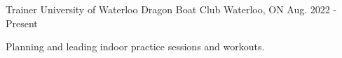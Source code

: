 

\begin{cventries}

  \cventry
    {Trainer} %
    {University of Waterloo Dragon Boat Club} %
    {Waterloo, ON} %
    {Aug. 2022 - Present} %
    {
      \begin{cvitems} %
        \item {Planning and leading indoor practice sessions and workouts.}
      \end{cvitems}
    }

\end{cventries}
